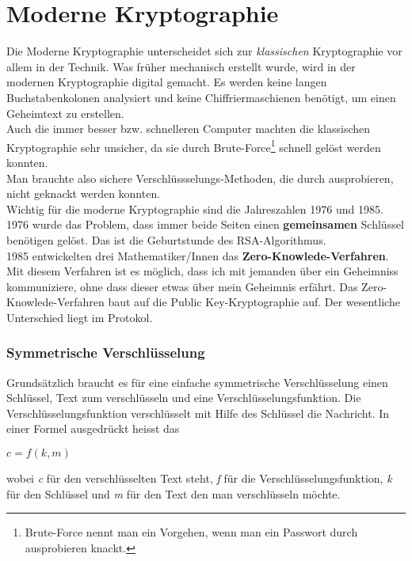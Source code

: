 \section{Moderne Kryptographie}
Die Moderne Kryptographie unterscheidet sich zur \textit{klassischen} Kryptographie vor allem in der Technik. Was früher mechanisch erstellt wurde, wird in der modernen Kryptographie digital gemacht. Es werden keine langen Buchstabenkolonen analysiert und keine Chiffriermaschienen benötigt, um einen Geheimtext zu erstellen.\\
Auch die immer besser bzw. schnelleren Computer machten die klassischen Kryptographie sehr unsicher, da sie durch Brute-Force\footnote{Brute-Force nennt man ein Vorgehen, wenn man ein Passwort durch ausprobieren knackt.} schnell gelöst werden konnten.\\
Man brauchte also sichere Verschlüssselungs-Methoden, die durch ausprobieren, nicht geknackt werden konnten.\\
Wichtig für die moderne Kryptographie sind die Jahreszahlen 1976 und 1985.\\
1976 wurde das Problem, dass immer beide Seiten einen \textbf{gemeinsamen} Schlüssel benötigen gelöst. Das ist die Geburtstunde des RSA-Algorithmus.\\
1985 entwickelten drei Mathematiker/Innen das \textbf{Zero-Knowlede-Verfahren}. Mit diesem Verfahren ist es möglich, dass ich mit jemanden über ein Geheimniss kommuniziere, ohne dass dieser etwas über mein Geheimnis erfährt. Das Zero-Knowlede-Verfahren baut auf die Public Key-Kryptographie auf. Der wesentliche Unterschied liegt im Protokol.
%
\subsubsection{Symmetrische Verschlüsselung}
Grundsätzlich braucht es für eine einfache symmetrische Verschlüsselung einen Schlüssel, Text zum verschlüsseln und eine Verschlüsselungsfunktion.
Die Verschlüsselungsfunktion verschlüsselt mit Hilfe des Schlüssel die Nachricht.
In einer Formel ausgedrückt heisst das
 \begin{center}
$c = f ( k, m )$
 \end{center}
wobei \textit{c} für den verschlüsselten Text steht, \textit{f} für die Verschlüsselungsfunktion, \textit{k} für den Schlüssel und \textit{m} für den Text den man verschlüsseln möchte.\\

